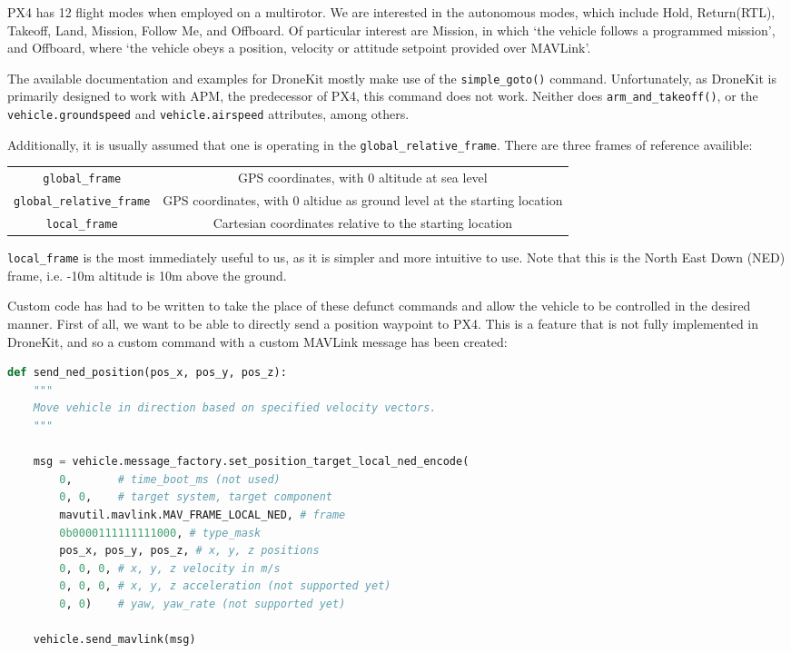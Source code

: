 \documentclass[11pt]{article}
\begin{document}
PX4 has 12 flight modes when employed on a multirotor. We are interested in the autonomous modes, which include Hold, Return(RTL), Takeoff, Land, Mission, Follow Me, and Offboard. Of particular interest are Mission, in which `the vehicle follows a programmed mission', and Offboard, where `the vehicle obeys a position, velocity or attitude setpoint provided over MAVLink'.\cite{PX4_user_guide}

\label{control_implementation}
The available documentation and examples for DroneKit mostly make use of the \lstinline[language=Python]|simple_goto()| command. Unfortunately, as DroneKit is primarily designed to work with APM, the predecessor of PX4, this command does not work. Neither does \lstinline[language=Python]|arm_and_takeoff()|, or the \lstinline|vehicle.groundspeed| and \lstinline|vehicle.airspeed| attributes, among others.

Additionally, it is usually assumed that one is operating in the \lstinline|global_relative_frame|. There are three frames of reference availible:
\begin{center}
\begin{tabular}{cc}
    \lstinline|global_frame| & GPS coordinates, with 0 altitude at sea level \\
    \lstinline|global_relative_frame| & GPS coordinates, with 0 altidue as ground level at the starting location \\
    \lstinline|local_frame| & Cartesian coordinates relative to the starting location
\end{tabular}
\end{center}
\lstinline|local_frame| is the most immediately useful to us, as it is simpler and more intuitive to use. Note that this is the North East Down (NED) frame, i.e. -10m altitude is 10m above the ground.

Custom code has had to be written to take the place of these defunct commands and allow the vehicle to be controlled in the desired manner. First of all, we want to be able to directly send a position waypoint to PX4. This is a feature that is not fully implemented in DroneKit, and so a custom command with a custom MAVLink message has been created:
\begin{lstlisting}[language=Python]
def send_ned_position(pos_x, pos_y, pos_z):
    """
    Move vehicle in direction based on specified velocity vectors.
    """

    msg = vehicle.message_factory.set_position_target_local_ned_encode(
        0,       # time_boot_ms (not used)
        0, 0,    # target system, target component
        mavutil.mavlink.MAV_FRAME_LOCAL_NED, # frame
        0b0000111111111000, # type_mask
        pos_x, pos_y, pos_z, # x, y, z positions
        0, 0, 0, # x, y, z velocity in m/s
        0, 0, 0, # x, y, z acceleration (not supported yet)
        0, 0)    # yaw, yaw_rate (not supported yet)

    vehicle.send_mavlink(msg)
\end{lstlisting}
\end{document}
